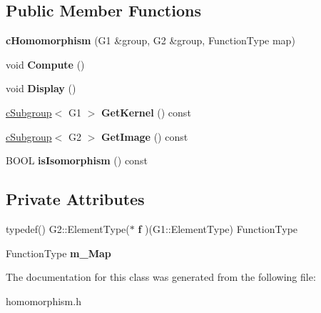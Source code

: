 \subsection*{Public Member Functions}
\begin{DoxyCompactItemize}
\item 
\hypertarget{classcHomomorphism_a826f07eaa6c431de9fc8ad236ebb7502}{{\bfseries c\-Homomorphism} (G1 \&group, G2 \&group, Function\-Type map)}\label{classcHomomorphism_a826f07eaa6c431de9fc8ad236ebb7502}

\item 
\hypertarget{classcHomomorphism_a4f6919efcd1c8446207a5150e3f29143}{void {\bfseries Compute} ()}\label{classcHomomorphism_a4f6919efcd1c8446207a5150e3f29143}

\item 
\hypertarget{classcHomomorphism_a0afe7b713cdb3e7628d049011334b539}{void {\bfseries Display} ()}\label{classcHomomorphism_a0afe7b713cdb3e7628d049011334b539}

\item 
\hypertarget{classcHomomorphism_a0f6fe4c7df91a345cd26023cf9b7c29d}{\hyperlink{classcSubgroup}{c\-Subgroup}$<$ G1 $>$ {\bfseries Get\-Kernel} () const }\label{classcHomomorphism_a0f6fe4c7df91a345cd26023cf9b7c29d}

\item 
\hypertarget{classcHomomorphism_ae2a5c5ab1fea57af03dbb926b05c5edc}{\hyperlink{classcSubgroup}{c\-Subgroup}$<$ G2 $>$ {\bfseries Get\-Image} () const }\label{classcHomomorphism_ae2a5c5ab1fea57af03dbb926b05c5edc}

\item 
\hypertarget{classcHomomorphism_ae5514786d9d5f0a185e5465c11075f13}{B\-O\-O\-L {\bfseries is\-Isomorphism} () const }\label{classcHomomorphism_ae5514786d9d5f0a185e5465c11075f13}

\end{DoxyCompactItemize}
\subsection*{Private Attributes}
\begin{DoxyCompactItemize}
\item 
\hypertarget{classcHomomorphism_a8b597c591cbbfb2a6ed415978c95d953}{typedef() G2\-::\-Element\-Type($\ast$ {\bfseries f} )(G1\-::\-Element\-Type) Function\-Type}\label{classcHomomorphism_a8b597c591cbbfb2a6ed415978c95d953}

\item 
\hypertarget{classcHomomorphism_ae6f45d109f0163c4ad74e5c30bcfe12c}{Function\-Type {\bfseries m\-\_\-\-Map}}\label{classcHomomorphism_ae6f45d109f0163c4ad74e5c30bcfe12c}

\end{DoxyCompactItemize}


The documentation for this class was generated from the following file\-:\begin{DoxyCompactItemize}
\item 
homomorphism.\-h\end{DoxyCompactItemize}
